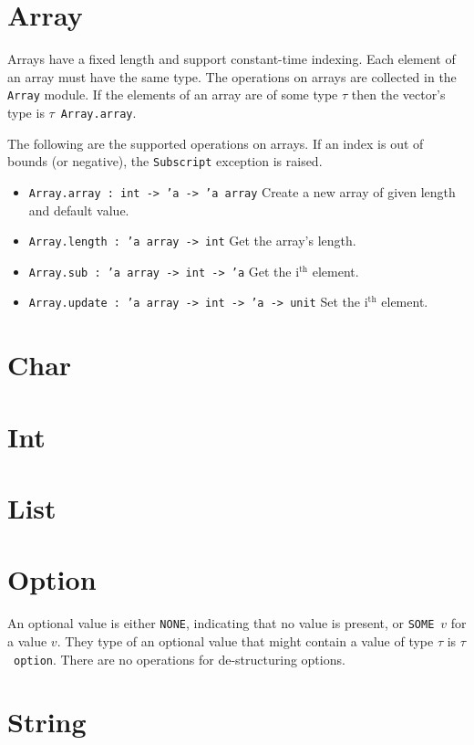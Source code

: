 \documentclass[12pt,a4paper]{book}
\begin{document}
\section{Array}
\label{sect:array}

Arrays have a fixed length and support constant-time indexing. Each element of an array must have the same type. The operations on arrays are collected in the \texttt{Array} module. If the elements of an array are of some type $\tau$ then the vector's type is $\tau$\ \texttt{Array.array}.

The following are the supported operations on arrays. If an index is out of bounds (or negative), the \texttt{Subscript} exception is raised.
\begin{itemize}
\item \texttt{Array.array : int -> 'a -> 'a array} Create a new array of given length and default value.
\item \texttt{Array.length : 'a array -> int} Get the array's length.
\item \texttt{Array.sub : 'a array -> int -> 'a} Get the i$^\textrm{th}$ element.
\item \texttt{Array.update : 'a array -> int -> 'a -> unit} Set the i$^\textrm{th}$ element.
\end{itemize}

\section{Char}
\label{sect:char}

\section{Int}

\section{List}
\label{sect:list}

\section{Option} An optional value is either \texttt{NONE}, indicating that no value is present, or \texttt{SOME}\ $v$ for a value $v$. They type of an optional value that might contain a value of type $\tau$ is $\tau$\ \texttt{option}. There are no operations for de-structuring options.

\section{String}
\label{sect:string}
\end{document}
